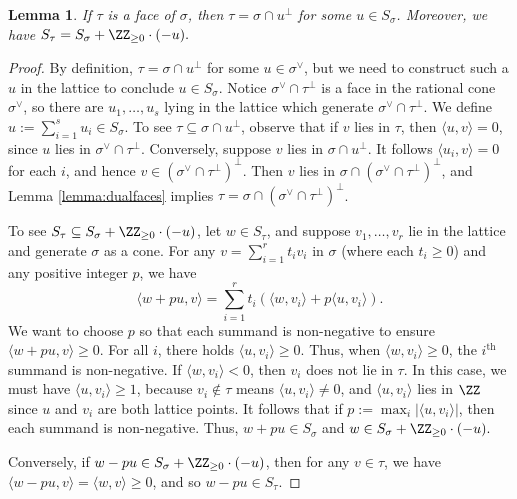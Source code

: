 \documentclass[12pt]{amsart}
\theoremstyle{plain}
\newtheorem{lemma}[theorem]{Lemma}
\theoremstyle{definition}
\begin{document}
\begin{lemma}
If $\tau$ is a face of $\sigma$, then $\tau = \sigma \cap u^\perp$ for some $u \in S_\sigma$.
Moreover, we have $S_\tau =S_\sigma + \ZZ_{\ge 0} \cdot (-u).$
\end{lemma}
\begin{proof}
By definition, $\tau = \sigma \cap u^\perp$ for some $u \in \sigma^\vee$, but we need to construct such a $u$ in the lattice to conclude $u \in S_\sigma$.
Notice $\sigma^\vee \cap \tau^\perp$ is a face in the rational cone $\sigma^\vee$, so there are $u_1, \ldots, u_s$ lying in the lattice which generate $\sigma^\vee \cap \tau^\perp$.
We define $u := \sum_{i=1}^s u_i \in S_\sigma$.
To see $\tau \subseteq \sigma \cap u^\perp$, observe that if $v$ lies in $\tau$, then $\langle u, v\rangle = 0$, since $u$ lies in $\sigma^\vee \cap \tau^\perp$.
Conversely, suppose $v$ lies in $\sigma \cap u^\perp$.
It follows $\langle u_i, v \rangle = 0$ for each $i$, and hence $v \in (\sigma^\vee \cap \tau^\perp)^\perp$.
Then $v$ lies in $\sigma \cap (\sigma^\vee \cap \tau^\perp)^\perp$, and Lemma \ref{lemma:dualfaces} implies  $\tau = \sigma \cap (\sigma^\vee \cap \tau^\perp)^\perp$.

To see $S_\tau \subseteq S_\sigma + \ZZ_{\ge 0} \cdot (-u)$, let $w \in S_\tau$, and suppose $v_1, \ldots, v_r$ lie in the lattice and generate $\sigma$ as a cone.
For any $v = \sum_{i=1}^r t_i v_i$ in $\sigma$ (where each $t_i \ge 0$) and any positive integer $p$, we have
$$\langle w + pu, v\rangle = \sum_{i=1}^r t_i \left( \langle w, v_i \rangle + p \langle u, v_i \rangle \right).$$
We want to choose $p$ so that each summand is non-negative to ensure $\langle w+pu, v \rangle \ge 0$.
For all $i$, there holds $\langle u, v_i \rangle \ge 0$.
Thus, when $\langle w, v_i \rangle \ge 0$, the $i^\text{th}$ summand is non-negative.
If $\langle w, v_i\rangle < 0$, then $v_i$ does not lie in $\tau$.
In this case, we must have $\langle u, v_i\rangle \ge 1$, because $v_i \notin \tau$ means $\langle u, v_i \rangle \ne 0$, and $\langle u, v_i \rangle$ lies in $\ZZ$ since $u$ and $v_i$ are both lattice points.
It follows that if $p := \max_i |\langle u, v_i\rangle|$, then each summand is non-negative.
Thus, $w + pu \in S_\sigma$ and $w \in S_\sigma + \ZZ_{\ge 0} \cdot (-u).$

Conversely, if $w - pu \in S_\sigma + \ZZ_{\ge 0} \cdot (-u)$, then for any $v \in \tau$, we have $\langle w - pu, v\rangle = \langle w, v \rangle \ge 0$, and so $w - pu \in S_\tau$.
\end{proof}
\end{document}
